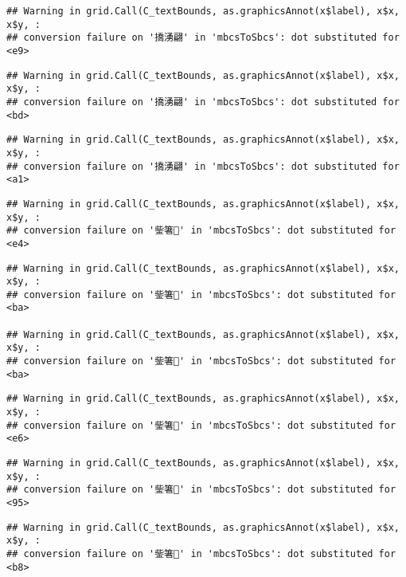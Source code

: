 \documentclass[
]{article}
\begin{document}
\begin{verbatim}
## Warning in grid.Call(C_textBounds, as.graphicsAnnot(x$label), x$x, x$y, :
## conversion failure on '撟湧翩' in 'mbcsToSbcs': dot substituted for <e9>
\end{verbatim}

\begin{verbatim}
## Warning in grid.Call(C_textBounds, as.graphicsAnnot(x$label), x$x, x$y, :
## conversion failure on '撟湧翩' in 'mbcsToSbcs': dot substituted for <bd>
\end{verbatim}

\begin{verbatim}
## Warning in grid.Call(C_textBounds, as.graphicsAnnot(x$label), x$x, x$y, :
## conversion failure on '撟湧翩' in 'mbcsToSbcs': dot substituted for <a1>
\end{verbatim}

\begin{verbatim}
## Warning in grid.Call(C_textBounds, as.graphicsAnnot(x$label), x$x, x$y, :
## conversion failure on '鈭箸' in 'mbcsToSbcs': dot substituted for <e4>
\end{verbatim}

\begin{verbatim}
## Warning in grid.Call(C_textBounds, as.graphicsAnnot(x$label), x$x, x$y, :
## conversion failure on '鈭箸' in 'mbcsToSbcs': dot substituted for <ba>

## Warning in grid.Call(C_textBounds, as.graphicsAnnot(x$label), x$x, x$y, :
## conversion failure on '鈭箸' in 'mbcsToSbcs': dot substituted for <ba>
\end{verbatim}

\begin{verbatim}
## Warning in grid.Call(C_textBounds, as.graphicsAnnot(x$label), x$x, x$y, :
## conversion failure on '鈭箸' in 'mbcsToSbcs': dot substituted for <e6>
\end{verbatim}

\begin{verbatim}
## Warning in grid.Call(C_textBounds, as.graphicsAnnot(x$label), x$x, x$y, :
## conversion failure on '鈭箸' in 'mbcsToSbcs': dot substituted for <95>
\end{verbatim}

\begin{verbatim}
## Warning in grid.Call(C_textBounds, as.graphicsAnnot(x$label), x$x, x$y, :
## conversion failure on '鈭箸' in 'mbcsToSbcs': dot substituted for <b8>
\end{verbatim}
\end{document}
